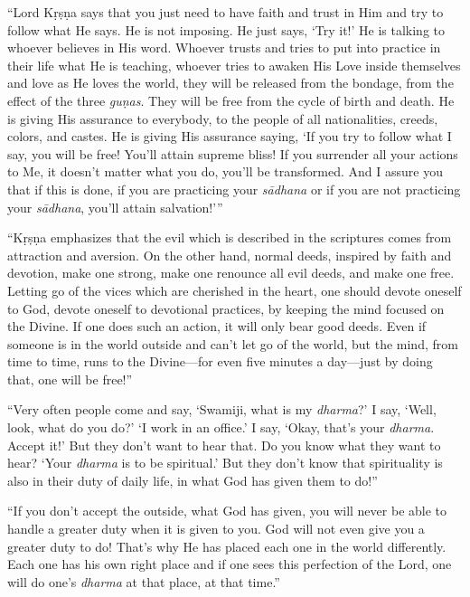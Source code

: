 \documentclass[12pt, twoside, openright]{memoir}
\begin{document}
\enquote{Lord Kṛṣṇa says that you just need to have faith and trust in Him and try to follow what He says. He is not imposing. He just says, \enquote{Try it!} He is talking to whoever believes in His word. Whoever trusts and tries to put into practice in their life what He is teaching, whoever tries to awaken His Love inside themselves and love as He loves the world, they will be released from the bondage, from the effect of the three \textit{guṇas}. They will be free from the cycle of birth and death. He is giving His assurance to everybody, to the people of all nationalities, creeds, colors, and castes. He is giving His assurance saying, \enquote{If you try to follow what I say, you will be free! You’ll attain supreme bliss! If you surrender all your actions to Me, it doesn’t matter what you do, you’ll be transformed. And I assure you that if this is done, if you are practicing your \textit{sādhana} or if you are not practicing your \textit{sādhana}, you’ll attain salvation!}}

\enquote{Kṛṣṇa emphasizes that the evil which is described in the scriptures comes from attraction and aversion. On the other hand, normal deeds, inspired by faith and devotion, make one strong, make one renounce all evil deeds, and make one free. Letting go of the vices which are cherished in the heart, one should devote oneself to God, devote oneself to devotional practices, by keeping the mind focused on the Divine. If one does such an action, it will only bear good deeds. Even if someone is in the world outside and can’t let go of the world, but the mind, from time to time, runs to the Divine---for even five minutes a day---just by doing that, one will be free!}

\enquote{Very often people come and say, \enquote{Swamiji, what is my \textit{dharma}?} I say, \enquote{Well, look, what do you do?} \enquote{I work in an office.} I say, \enquote{Okay, that’s your \textit{dharma}. Accept it!} But they don’t want to hear that. Do you know what they want to hear? \enquote{Your \textit{dharma} is to be spiritual.} But they don’t know that spirituality is also in their duty of daily life, in what God has given them to do!}

\enquote{If you don’t accept the outside, what God has given, you will never be able to handle a greater duty when it is given to you. God will not even give you a greater duty to do! That’s why He has placed each one in the world differently. Each one has his own right place and if one sees this perfection of the Lord, one will do one’s \textit{dharma} at that place, at that time.}
\end{document}
